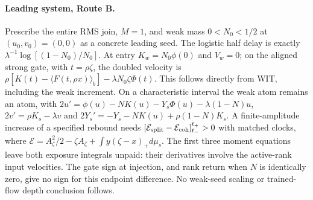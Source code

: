 \documentclass[11pt]{article}
\begin{document}
\paragraph{Leading system, Route B.}\label{an04swpv1:full}
Prescribe the entire RMS join, $M=1$, and weak mass $0<N_0<1/2$
at $(u_0,v_0)=(0,0)$ as a concrete leading seed.
The logistic half delay is exactly
$\lambda^{-1}\log[(1-N_0)/N_0]$. At entry $K_w=N_0\phi(0)$ and $V_w=0$;
on the aligned strong gate, with $t=\rho\zeta$, the doubled velocity is
$\rho[K(t)-\langle F(t,\rho x)\rangle_b]-\lambda N_0\zeta\Phi(t)$.
This follows directly from WIT, including the weak increment.
On a characteristic interval the weak atom remains an atom, with
$2u'=\phi(u)-NK(u)-Y_s\Phi(u)-\lambda(1-N)u$,
$2v'=\rho K_s-\lambda v$ and
$2Y_s'=-Y_s-NK(u)+\rho(1-N)K_s$.
A finite-amplitude increase of a specified rebound needs
$[\mathcal E_{\rm split}-\mathcal E_{\rm coh}]_{t_-}^{t_+}>0$
with matched clocks, where
$\mathcal E=A_\zeta^2/2-\zeta A_\zeta+\int y(\zeta-x)_+d\mu_s$.
The first three moment equations leave both exposure integrals unpaid:
their derivatives involve the active-rank input velocities.
The gate sign at injection, and rank return when $N$ is identically zero,
give no sign for this endpoint difference. No weak-seed scaling
or trained-flow depth conclusion follows.
\end{document}
